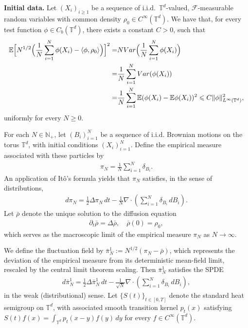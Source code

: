 \documentclass[UTF-8,reqno]{amsart}
\numberwithin{equation}{section}
\def\geq{\geqslant}
\def\leq{\leqslant}
\def\geq{\geqslant}
\def\leq{\leqslant}
\begin{document}
\textbf{Initial data.} Let $(X_i)_{i \geq 1}$ be a sequence of i.i.d.\ $\mathbb{T}^d$-valued, $\mathcal{F}$-measurable random variables with common density $\rho_0 \in C^\infty(\mathbb{T}^d)$. We have that, for every test function $\phi \in C_b(\mathbb{T}^d)$, there exists a constant $C>0$, such that
\begin{align}\label{fluc-initial}
\mathbb{E}\Big[N^{1/2}\Big(\frac{1}{N} \sum_{i=1}^N \phi(X_i) - \langle \phi, \rho_0 \rangle\Big)\Big]^2=&NVar\Big(\frac{1}{N}\sum_{i=1}^N\phi(X_i)\Big)\notag\\
=&\frac{1}{N}\sum_{i=1}^NVar(\phi(X_i))\notag\\
=&\frac{1}{N}\sum_{i=1}^N\mathbb{E}(\phi(X_i)-\mathbb{E}\phi(X_i))^2\leq C\|\phi\|_{L^{\infty}(\mathbb{T}^d)}^2, 
\end{align}
uniformly for every $N\geq0$. 

For each $N \in \mathbb{N}_+$, let $(B_i)_{i=1}^N$ be a sequence of i.i.d. Brownian motions on the torus $\mathbb{T}^d$, with initial conditions $(X_i)_{i=1}^N$. Define the empirical measure associated with these particles by
\begin{align*}
\pi_N = \frac{1}{N} \sum_{i=1}^N \delta_{B_i}.
\end{align*}
An application of It\^o's formula yields that $\pi_N$ satisfies, in the sense of distributions,
\begin{align*}
d\pi_N = \frac{1}{2} \Delta \pi_N \, dt - \frac{1}{N} \nabla \cdot \left( \sum_{i=1}^N \delta_{B_i} \, dB_i \right).
\end{align*}
Let $\bar{\rho}$ denote the unique solution to the diffusion equation
\begin{align}\label{diffusion-eq}
\partial_t \bar{\rho} = \Delta \bar{\rho}, \quad \bar{\rho}(0) = \rho_0,
\end{align}
which serves as the macroscopic limit of the empirical measure $\pi_N$ as $N \to \infty$. 

We define the fluctuation field by $\bar{\pi}^1_N := N^{1/2}(\pi_N - \bar{\rho})$, which represents the deviation of the empirical measure from its deterministic mean-field limit, rescaled by the central limit theorem scaling. Then $\bar{\pi}^1_N$ satisfies the SPDE
\begin{align}\label{pi1n}
d\bar{\pi}^1_N = \frac{1}{2} \Delta \bar{\pi}^1_N \, dt - \frac{1}{\sqrt{N}} \nabla \cdot \left( \sum_{i=1}^N \delta_{B_i} \, dB_i \right),
\end{align}
in the weak (distributional) sense. Let $\{S(t)\}_{t \in [0,T]}$ denote the standard heat semigroup on $\mathbb{T}^d$, with associated smooth transition kernel $p_t(x)$ satisfying $S(t)f(x) = \int_{\mathbb{T}^d} p_t(x - y) f(y) \, dy$ for every $f \in C^\infty(\mathbb{T}^d)$. 
\end{document}

